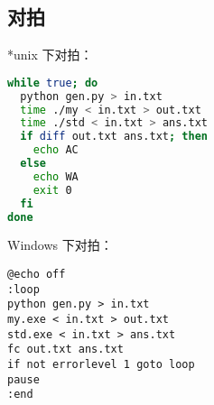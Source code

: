 \subsection{对拍}

*unix 下对拍：
\begin{lstlisting}[language=bash]
while true; do
  python gen.py > in.txt
  time ./my < in.txt > out.txt
  time ./std < in.txt > ans.txt
  if diff out.txt ans.txt; then
    echo AC
  else
    echo WA
    exit 0
  fi
done
\end{lstlisting}

Windows 下对拍：
\begin{lstlisting}[language=command.com]
@echo off
:loop
python gen.py > in.txt
my.exe < in.txt > out.txt
std.exe < in.txt > ans.txt
fc out.txt ans.txt
if not errorlevel 1 goto loop
pause
:end
\end{lstlisting}